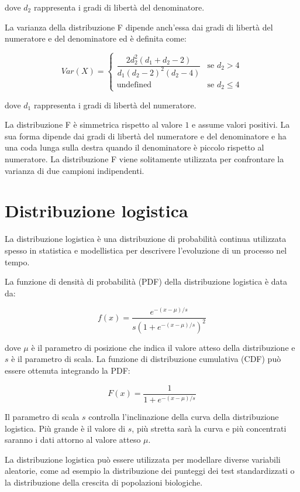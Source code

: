 dove $d_2$ rappresenta i gradi di libertà del denominatore.

La varianza della distribuzione F dipende anch'essa dai gradi di libertà del numeratore e del denominatore ed è definita come:

$$ Var(X) = \begin{cases} 
\dfrac{2d_2^2(d_1+d_2-2)}{d_1(d_2-2)^2(d_2-4)} & \text{se } d_2 > 4 \\
\text{undefined} & \text{se } d_2 \leq 4 
\end{cases} $$

dove $d_1$ rappresenta i gradi di libertà del numeratore.

La distribuzione F è simmetrica rispetto al valore $1$ e assume valori positivi. La sua forma dipende dai gradi di libertà del numeratore e del denominatore e ha una coda lunga sulla destra quando il denominatore è piccolo rispetto al numeratore. La distribuzione F viene solitamente utilizzata per confrontare la varianza di due campioni indipendenti.

\section{Distribuzione logistica}
La distribuzione logistica è una distribuzione di probabilità continua utilizzata spesso in statistica e modellistica per descrivere l'evoluzione di un processo nel tempo.

La funzione di densità di probabilità (PDF) della distribuzione logistica è data da:

$$f(x) = \frac{e^{-(x-\mu)/s}}{s(1+e^{-(x-\mu)/s})^2}$$

dove $\mu$ è il parametro di posizione che indica il valore atteso della distribuzione e $s$ è il parametro di scala. La funzione di distribuzione cumulativa (CDF) può essere ottenuta integrando la PDF:

$$F(x) = \frac{1}{1+e^{-(x-\mu)/s}}$$

Il parametro di scala $s$ controlla l'inclinazione della curva della distribuzione logistica. Più grande è il valore di $s$, più stretta sarà la curva e più concentrati saranno i dati attorno al valore atteso $\mu$.

La distribuzione logistica può essere utilizzata per modellare diverse variabili aleatorie, come ad esempio la distribuzione dei punteggi dei test standardizzati o la distribuzione della crescita di popolazioni biologiche.
